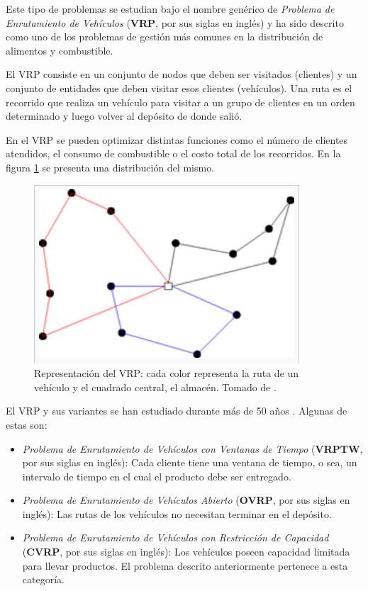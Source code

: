 \documentclass[a4paper,10pt,twocolumn]{article}
\begin{document}
	Este tipo de problemas se estudian bajo el nombre genérico de \textit{Problema de 
	Enrutamiento de Vehículos} (\textbf{VRP}, por sus siglas en inglés) y ha sido 
	descrito como uno de los problemas de gestión más comunes en la distribución de 
	alimentos y combustible.

	El VRP consiste en un conjunto de nodos que deben ser visitados (clientes) y un 
	conjunto de entidades que deben visitar esos clientes (vehículos). Una ruta es el 
	recorrido que realiza un vehículo para visitar a un grupo de clientes en un orden 
	determinado y luego volver al depósito de donde	salió.

	En el VRP se pueden optimizar distintas funciones como el número de clientes 
	atendidos, el consumo de combustible o el costo total de los recorridos. En la figura 
	\ref{fig:vrp} se presenta una distribución del mismo.

	\begin{figure}[htb]%
		\begin{center}
			\includegraphics[scale=.45]{Graphics/vrp.png}
		\end{center}
		
		\caption{Representación del VRP: cada color representa la ruta de un vehículo y
		el cuadrado central, el almacén. Tomado de \cite{wiki}.\label{fig:vrp}}%
	\end{figure}

	El VRP y sus variantes se han estudiado durante más de 50 años \cite{Dantzig}.
	Algunas de estas son:

	\begin{itemize}
		\item \textit{Problema de Enrutamiento de Vehículos con Ventanas de Tiempo} 
			  (\textbf{VRPTW}, por sus siglas en inglés): Cada cliente tiene una ventana
			  de tiempo, o sea, un intervalo de tiempo en el cual el producto debe ser 
			  entregado.
	
		\item \textit{Problema de Enrutamiento de Vehículos Abierto} (\textbf{OVRP}, por
			  sus siglas en inglés): Las rutas de los vehículos no necesitan terminar en
			  el depósito.
	
		\item \textit{Problema de Enrutamiento de Vehículos con Res\-tric\-ción de Capacidad} 
			  (\textbf{CVRP}, por sus siglas en inglés): Los vehículos poseen capacidad 
			  limitada para llevar productos. El problema descrito anteriormente pertenece
			  a esta categoría.
	\end{itemize}
\end{document}
